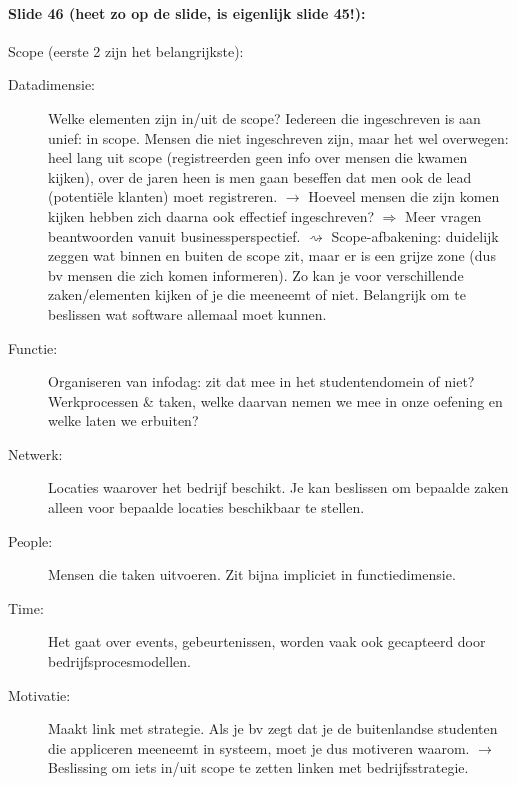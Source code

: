 \documentclass[10pt,a4paper]{report}
\begin{document}
\paragraph{Slide 46 (heet zo op de slide, is eigenlijk slide 45!):}Scope (eerste 2 zijn het belangrijkste):
\begin{description}
\item[Datadimensie:] Welke elementen zijn in/uit de scope? Iedereen die ingeschreven is aan unief: in scope. Mensen die niet ingeschreven zijn, maar het wel overwegen: heel lang uit scope (registreerden geen info over mensen die kwamen kijken), over de jaren heen is men gaan beseffen dat men ook de lead (potentiële klanten) moet registreren. $\rightarrow$ Hoeveel mensen die zijn komen kijken hebben zich daarna ook effectief ingeschreven? $\Rightarrow$ Meer vragen beantwoorden vanuit businessperspectief. $\rightsquigarrow$ Scope-afbakening: duidelijk zeggen wat binnen en buiten de scope zit, maar er is een grijze zone (dus bv mensen die zich komen informeren). Zo kan je voor verschillende zaken/elementen kijken of je die meeneemt of niet. Belangrijk om te beslissen wat software allemaal moet kunnen.
\item[Functie:] Organiseren van infodag: zit dat mee in het studentendomein of niet? Werkprocessen \& taken, welke daarvan nemen we mee in onze oefening en welke laten we erbuiten?
\item[Netwerk:] Locaties waarover het bedrijf beschikt. Je kan beslissen om bepaalde zaken alleen voor bepaalde locaties beschikbaar te stellen.
\item[People:] Mensen die taken uitvoeren. Zit bijna impliciet in functiedimensie.
\item[Time:] Het gaat over events, gebeurtenissen, worden vaak ook gecapteerd door bedrijfsprocesmodellen.
\item[Motivatie:] Maakt link met strategie. Als je bv zegt dat je de buitenlandse studenten die appliceren meeneemt in systeem, moet je dus motiveren waarom. $\rightarrow$ Beslissing om iets in/uit scope te zetten linken met bedrijfsstrategie.
\end{description}
\end{document}
